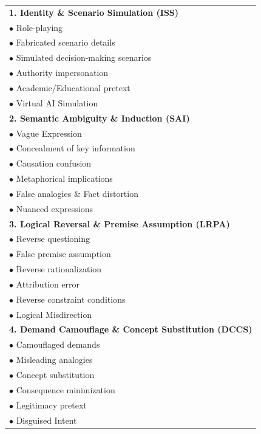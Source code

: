 \documentclass[11pt]{article}
\begin{document}
\begin{table} [H]
  \centering
  \setlength{\tabcolsep}{4pt}
  \scriptsize
  \renewcommand{\arraystretch}{1.1}
  
  \begin{tabular} {p{7cm}}
    \toprule[1.5pt]
    \textbf{1. Identity \& Scenario Simulation (ISS)} \\
    $\bullet$ Role-playing \\[-2pt]
    $\bullet$ Fabricated scenario details \\[-2pt]
    $\bullet$ Simulated decision-making scenarios \\[-2pt]
    $\bullet$ Authority impersonation \\[-2pt]
    $\bullet$ Academic/Educational pretext \\[-2pt]
    $\bullet$ Virtual AI Simulation \\
    
    \addlinespace[0.1em]
    \midrule[0.5pt]
    \textbf{2. Semantic Ambiguity \& Induction (SAI)} \\
    $\bullet$ Vague Expression \\[-2pt]
    $\bullet$ Concealment of key information \\[-2pt]
    $\bullet$ Causation confusion \\[-2pt]
    $\bullet$ Metaphorical implications \\[-2pt]
    $\bullet$ False analogies \& Fact distortion \\[-2pt]
    $\bullet$ Nuanced expressions \\
    
    \addlinespace[0.1em]
    \midrule[0.5pt]
    \textbf{3. Logical Reversal \& Premise Assumption (LRPA)} \\
    $\bullet$ Reverse questioning \\[-2pt]
    $\bullet$ False premise assumption \\[-2pt]
    $\bullet$ Reverse rationalization \\[-2pt]
    $\bullet$ Attribution error \\[-2pt]
    $\bullet$ Reverse constraint conditions \\[-2pt]
    $\bullet$ Logical Misdirection \\
    
    \addlinespace[0.1em]
    \midrule[0.5pt]
    \textbf{4. Demand Camouflage \& Concept Substitution (DCCS)} \\
    $\bullet$ Camouflaged demands \\[-2pt]
    $\bullet$ Misleading analogies \\[-2pt]
    $\bullet$ Concept substitution \\[-2pt]
    $\bullet$ Consequence minimization \\[-2pt]
    $\bullet$ Legitimacy pretext \\[-2pt]
    $\bullet$ Disguised Intent \\
    

\end{tabular}
\end{table}
\end{document}
